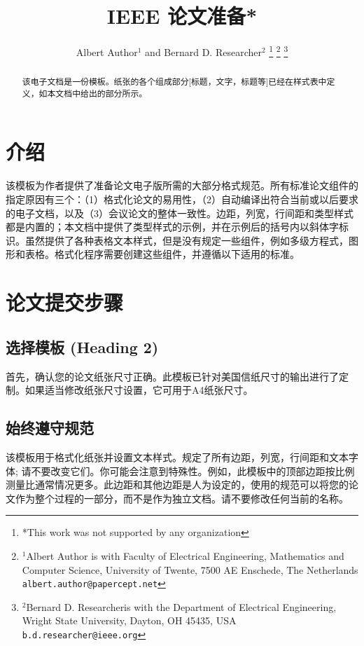 \documentclass[letterpaper, 10 pt, conference]{ieeeconf}  %
\title{\LARGE \bf
IEEE 论文准备*
}
\author{Albert Author$^{1}$ and Bernard D. Researcher$^{2}$%
\thanks{*This work was not supported by any organization}%
\thanks{$^{1}$Albert Author is with Faculty of Electrical Engineering, Mathematics and Computer Science,
        University of Twente, 7500 AE Enschede, The Netherlands
        {\tt\small albert.author@papercept.net}}%
\thanks{$^{2}$Bernard D. Researcheris with the Department of Electrical Engineering, Wright State University,
        Dayton, OH 45435, USA
        {\tt\small b.d.researcher@ieee.org}}%
}
\begin{document}
\maketitle
\thispagestyle{empty}
\pagestyle{empty}


\begin{abstract}

该电子文档是一份模板。纸张的各个组成部分[标题，文字，标题等]已经在样式表中定义，如本文档中给出的部分所示。

\end{abstract}


\section{介绍}

该模板为作者提供了准备论文电子版所需的大部分格式规范。所有标准论文组件的指定原因有三个：（1）格式化论文的易用性，（2）自动编译出符合当前或以后要求的电子文档，以及（3）会议论文的整体一致性。边距，列宽，行间距和类型样式都是内置的；本文档中提供了类型样式的示例，并在示例后的括号内以斜体字标识。虽然提供了各种表格文本样式，但是没有规定一些组件，例如多级方程式，图形和表格。格式化程序需要创建这些组件，并遵循以下适用的标准。

\section{论文提交步骤}

\subsection{选择模板 (Heading 2)}

首先，确认您的论文纸张尺寸正确。此模板已针对美国信纸尺寸的输出进行了定制。如果适当修改纸张尺寸设置，它可用于A4纸张尺寸。

\subsection{始终遵守规范}

该模板用于格式化纸张并设置文本样式。规定了所有边距，列宽，行间距和文本字体; 请不要改变它们。你可能会注意到特殊性。例如，此模板中的顶部边距按比例测量比通常情况更多。此边距和其他边距是人为设定的，使用的规范可以将您的论文作为整个过程的一部分，而不是作为独立文档。请不要修改任何当前的名称。
\end{document}
